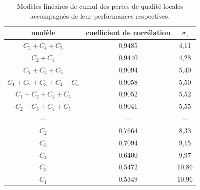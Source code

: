 \begin{table}[htbp]
\centering
\begin{tabular}{ccc}\toprule
\textbf{modèle}					& \textbf{coefficient de corrélation}		& $\sigma_e$ \\ \toprule
$C_2+C_4+C_5$					& 0,9485			& 4,11			\\\midrule
$C_2+C_4$							& 0,9440			& 4,28			\\\midrule
$C_2+C_3+C_5$					& 0,9094			& 5,40			\\\midrule
$C_1+C_2+C_3+C_4+C_5$	& 0,9058			& 5,50			\\\midrule
$C_1+C_2+C_4+C_5$			& 0,9052			& 5,52			\\\midrule
$C_2+C_3+C_4+C_5$			& 0,9041			& 5,55			\\\midrule
$\cdots$								& $\cdots$		& $\cdots$	\\\midrule
$C_2$									& 0,7664			& 8,33			\\\midrule
$C_3$									& 0,7094			& 9,15			\\\midrule
$C_4$									& 0,6400			& 9,97			\\\midrule
$C_5$									& 0,5472			& 10,86		\\\midrule
$C_1$									& 0,5349			& 10,96		\\\bottomrule
\end{tabular}
\caption{Modèles linéaires de cumul des pertes de qualité locales accompagnés de leur performances respectives.}
\label{tab:combination}
\end{table}

